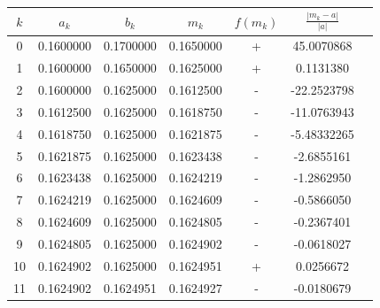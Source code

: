\documentclass{article}
\begin{document}
\begin{center}
    \begin{tabular}{||c c c c c c c||} 
    \hline
    $k$ & $a_k$ & $b_k$ & $m_k$ & $f(m_k)$ & $\frac{|m_k - a|}{|a|}$ \\ [0.8ex] 
    \hline\hline
    0 & 0.1600000 & 0.1700000 & 0.1650000 & + & 45.0070868 \\ 
    \hline
    1 & 0.1600000 & 0.1650000 & 0.1625000  & + & 0.1131380 \\
    \hline
    2 & 0.1600000 & 0.1625000 & 0.1612500 & - & -22.2523798\\
    \hline
    3 & 0.1612500 & 0.1625000 & 0.1618750 & - & -11.0763943\\
    \hline
    4 & 0.1618750 & 0.1625000 & 0.1621875 & - & -5.48332265\\
    \hline 
    5 & 0.1621875 & 0.1625000 & 0.1623438 & - & -2.6855161\\ 
    \hline 
    6 & 0.1623438 & 0.1625000 & 0.1624219 & - & -1.2862950\\ 
    \hline 
    7 & 0.1624219 & 0.1625000& 0.1624609 & - & -0.5866050\\ 
    \hline 
    8 & 0.1624609 & 0.1625000 & 0.1624805 & - & -0.2367401\\ 
    \hline 
    9 & 0.1624805 & 0.1625000 & 0.1624902  & - & -0.0618027\\ 
    \hline 
    10 & 0.1624902 & 0.1625000 & 0.1624951 & + & 0.0256672\\ 
    \hline 
    11 & 0.1624902 & 0.1624951 & 0.1624927 & - & -0.0180679\\[1ex]
    \hline
   \end{tabular}
\end{center}
\end{document}
